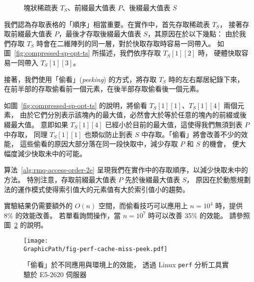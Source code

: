 \begin{figure}[!thb]
  \centering {}  \caption{塊狀稀疏表 $T_S$、前綴最大值表 $P$、後綴最大值表 $S$}
  \label{fig:compressed-sp-opt}
\end{figure}

我們認為存取表格的「順序」相當重要。在實作中，首先存取稀疏表 $T_S$，
接著存取前綴最大值表 $P$，最後才存取後綴最大值表 $S$，其原因在於以下幾點：
由於我們存取 $T_S$ 時會在二維陣列的同一層，對於快取存取時容易一同帶入。
如圖~\ref{fig:compressed-sp-opt-ts} 所描述，我們依序存取 $T_{S}[1][2]$ 時，
硬體快取容易一同帶入 $T_{S}[1][3]$。

接著，我們使用「偷看」({\em peeking}) 的方式，將存取 $T_S$ 時的左右鄰居紀錄下來，
在前半部的存取偷看前一個元素，在後半部存取偷看後一個元素。

如圖~\ref{fig:compressed-sp-opt-ts} 的說明，將偷看 $T_{S}[1][1]$、$T_{S}[1][4]$ 兩個元素，
由於它們分別表示該塊內的最大值，必然會大於等於任意的塊內的前綴或後綴最大值。
意即如果 $T_{S}[1][4]$ 已經小於目前的最大值，這使得我們無須到表 $P$ 中存取，
同理 $T_{S}[1][1]$ 也類似防止到表 $S$ 中存取。「偷看」將會改善不少的效能，
這些偷看的原因大部分落在同一段快取中，減少存取 $P$ 和 $S$ 的機會，
便大幅度減少快取未中的可能。

算法~\ref{alg:rmq-access-order-2e} 呈現我們在實作中的存取順序，以減少快取未中的方法。
特別注意，存取前綴最大值表 $P$ 先於後綴最大值表 $S$，
原因在於動態規劃法的運作模式使得索引值大的元素值有大於索引值小的趨勢。

實驗結果仍需要額外的 $O(n)$ 空間，而偷看技巧可以應用上 $n=10^4$ 時，提供 8\% 的效能改善。
若單看詢問操作，當 $n=10^7$ 時可以改善 35\% 的效能。
請參照圖~\ref{fig:fig-perf-cache-miss-peek} 的說明。

\begin{figure}
  \centering
  \texttt{[image: \\GraphicPath/fig-perf-cache-miss-peek.pdf]}
  \caption{
  「偷看」於不同應用與環境上的效能，
  透過 Linux {\tt perf} 分析工具實驗於 E5-2620 伺服器}
  \label{fig:fig-perf-cache-miss-peek}
\end{figure}



